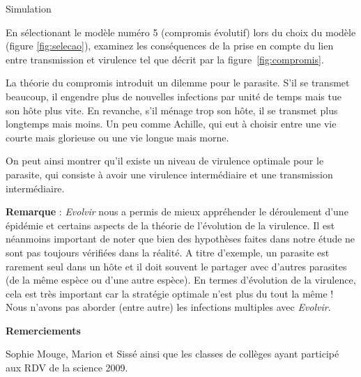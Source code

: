 \documentclass[12pt]{article}
\begin{document}
\begin{bclogo}[couleur = gray!30, logo = \bclampe , barre =                                                      
none, noborder=true ]{Simulation}                                                                                  

En sélectionant le modèle numéro 5 (compromis évolutif) lors du choix
du modèle (figure \ref{fig:selecao}), examinez les conséquences de la
prise en compte du lien entre transmission et virulence tel que décrit
par la figure~\ref{fig:compromis}.

\end{bclogo}                                                                                                        

\vspace{1cm}


La théorie du compromis introduit un dilemme pour le parasite. S’il se
transmet beaucoup, il engendre plus de nouvelles infections par unité
de temps mais tue son hôte plus vite. En revanche, s’il ménage trop
son hôte, il se transmet plus longtemps mais moins. Un peu comme
Achille, qui eut à choisir entre une vie courte mais glorieuse ou une
vie longue mais morne.

On peut ainsi montrer qu’il existe un niveau de virulence optimale
pour le parasite, qui consiste à avoir une virulence intermédiaire et
une transmission intermédiaire.

\vspace*{3cm}

\textbf{Remarque} : \textit{Evolvir} nous a permis de mieux
appréhender le déroulement d'une épidémie et certains aspects de la
théorie de l'évolution de la virulence. Il est néanmoins important de
noter que bien des hypothèses faites dans notre étude ne sont pas
toujours vérifiées dans la réalité. A titre d'exemple, un parasite est
rarement seul dans un hôte et il doit souvent le partager avec
d’autres parasites (de la même espèce ou d’une autre espèce). En
termes d’évolution de la virulence, cela est très important car la
stratégie optimale n’est plus du tout la même ! Nous n'avons pas
aborder (entre autre) les infections multiples avec \textit{Evolvir}.


\vspace*{1cm}

\begin{large}
  \textbf{Remerciements}
\end{large}

Sophie Mouge, Marion et Sissé ainsi que les classes de collèges ayant
participé aux RDV de la science 2009.







\end{document}
